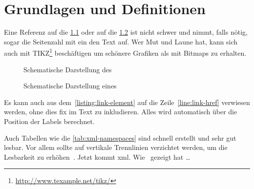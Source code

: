 
\chapter{Grundlagen und Definitionen}%
\label{chap:GrundlagenDefinitionen}%
\blindtext%

Eine Referenz auf die \cref{fig:wot} oder auf die \cref{fig:ht} ist nicht schwer und nimmt, falls nötig, sogar die Seitenzahl mit ein den Text auf. Wer Mut und
Laune hat, kann sich auch mit TIKZ\footnote{\url{http://www.texample.net/tikz/}} beschäftigen um schönere Grafiken als mit Bitmaps zu erhalten.

\begin{figure}%
\centering%
%
\caption{Schematische Darstellung des }%
\label{fig:wot}%
\end{figure}%


\begin{figure}%
\centering%
\begin{sideways}%
%
\end{sideways}%
\caption{Schematische Darstellung eines }%
\label{fig:ht}%
\end{figure}%

Es kann auch aus dem~\cref{listing:link-element} auf die Zeile~\ref{line:link-href} verwiesen werden, ohne dies fix im Text zu inkludieren. Alles wird automatisch über die
Position der Labels berechnet.

%

Auch Tabellen wie die \cref{tab:xml-namespaces} sind schnell erstellt und sehr gut lesbar. Vor allem sollte auf vertikale Trennlinien verzichtet werden, um die%
Lesbarkeit zu erhöhen~\cite{latex}. Jetzt kommt \gls{xml}. Wie~ gezeigt hat \ldots%

